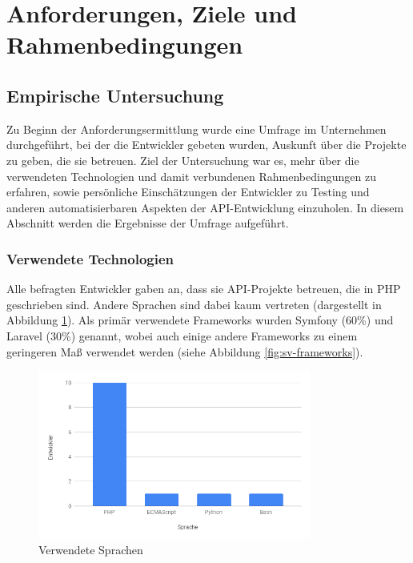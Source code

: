 
\section{Anforderungen, Ziele und Rahmenbedingungen}

\subsection{Empirische Untersuchung}

Zu Beginn der Anforderungsermittlung wurde eine Umfrage im Unternehmen durchgeführt, bei der die Entwickler gebeten wurden, Auskunft über die Projekte zu geben, die sie betreuen. Ziel der Untersuchung war es, mehr über die verwendeten Technologien und damit verbundenen Rahmenbedingungen zu erfahren, sowie persönliche Einschätzungen der Entwickler zu Testing und anderen automatisierbaren Aspekten der API-Entwicklung einzuholen. In diesem Abschnitt werden die Ergebnisse der Umfrage aufgeführt.\\

\subsubsection{Verwendete Technologien}

Alle befragten Entwickler gaben an, dass sie API-Projekte betreuen, die in PHP geschrieben sind. Andere Sprachen sind dabei kaum vertreten (dargestellt in Abbildung \ref{fig:sv-languages}). Als primär verwendete Frameworks wurden Symfony (60\%) und Laravel (30\%) genannt, wobei auch einige andere Frameworks zu einem geringeren Maß verwendet werden (siehe Abbildung \ref{fig:sv-frameworks}).

\begin{figure}[H]
\centering
  \includegraphics[width=0.8\textwidth]{../images/languages.png}
  \caption{Verwendete Sprachen}
  \label{fig:sv-languages}
\end{figure}

